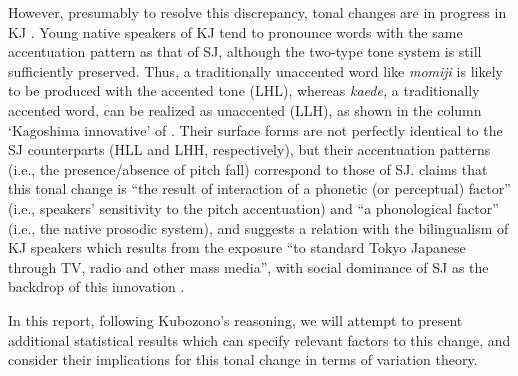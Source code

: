 \documentclass[output=paper]{LSP/langsci}
\begin{document}
However, presumably to resolve this discrepancy, tonal changes are in progress in KJ \citep{kubozono_tonal_2007}. Young native speakers of KJ tend to pronounce words with the same accentuation pattern as that of SJ, although the two-type tone system is still sufficiently preserved. Thus, a traditionally unaccented word like \textit{momiji }is likely to be produced with the accented tone (LHL), whereas \textit{kaede,} a traditionally accented word, can be realized as unaccented (LLH), as shown in the column ‘Kagoshima innovative’ of . Their surface forms are not perfectly identical to the SJ counterparts (HLL and LHH, respectively), but their accentuation patterns (i.e., the presence/absence of pitch fall) correspond to those of SJ. \citet[348]{kubozono_tonal_2007} claims that this tonal change is ``the result of interaction of a phonetic (or perceptual) factor'' (i.e., speakers' sensitivity to the pitch accentuation) and ``a phonological factor'' (i.e., the native prosodic system), and suggests a relation with the bilingualism of KJ speakers which results from the exposure ``to standard Tokyo Japanese through TV, radio and other mass media'', with social dominance of SJ as the backdrop of this innovation \citep[323]{kubozono_tonal_2007}.
 
\begin{table} 
\caption{Surface tone and accentuation in SJ, Traditional KJ and Innovative KJ.}
\label{tab:2}
\end{table}

In this report, following Kubozono’s reasoning, we will attempt to present additional statistical results which can specify relevant factors to this change, and consider their implications for this tonal change in terms of variation theory.
\end{document}

